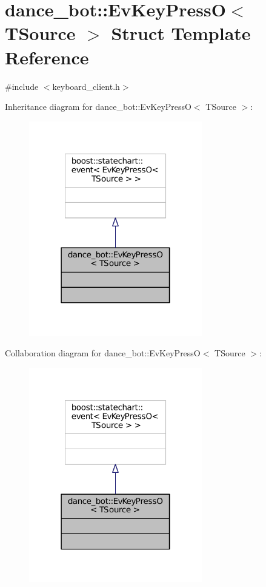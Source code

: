 \hypertarget{structdance__bot_1_1EvKeyPressO}{}\section{dance\+\_\+bot\+:\+:Ev\+Key\+PressO$<$ T\+Source $>$ Struct Template Reference}
\label{structdance__bot_1_1EvKeyPressO}


{\ttfamily \#include $<$keyboard\+\_\+client.\+h$>$}



Inheritance diagram for dance\+\_\+bot\+:\+:Ev\+Key\+PressO$<$ T\+Source $>$\+:
\nopagebreak
\begin{figure}[H]
\begin{center}
\leavevmode
\includegraphics[width=214pt]{structdance__bot_1_1EvKeyPressO__inherit__graph}
\end{center}
\end{figure}


Collaboration diagram for dance\+\_\+bot\+:\+:Ev\+Key\+PressO$<$ T\+Source $>$\+:
\nopagebreak
\begin{figure}[H]
\begin{center}
\leavevmode
\includegraphics[width=214pt]{structdance__bot_1_1EvKeyPressO__coll__graph}
\end{center}
\end{figure}



